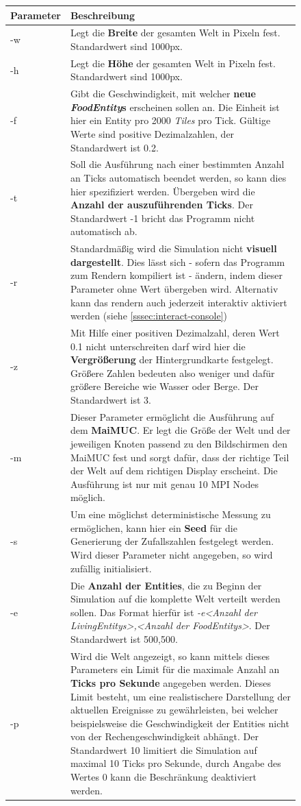 \documentclass[course=erap]{aspdoc}
\begin{document}
\newpage
\begin{figure}
\centering
\begin{longtable}{| p{2cm} | p{12cm} |}
\hline
Parameter & Beschreibung \\
\hline
\hline
-w & Legt die \textbf{Breite} der gesamten Welt in Pixeln fest. Standardwert sind 1000px.\\
\hline
-h & Legt die \textbf{Höhe} der gesamten Welt in Pixeln fest. Standardwert sind 1000px.\\
\hline
-f & Gibt die Geschwindigkeit, mit welcher \textbf{neue \emph{FoodEntity}s} erscheinen sollen an. Die Einheit ist hier ein Entity pro 2000 \emph{Tiles} pro Tick. Gültige Werte sind positive Dezimalzahlen, der Standardwert ist 0.2.\\
\hline
-t & Soll die Ausführung nach einer bestimmten Anzahl an Ticks automatisch beendet werden, so kann dies hier spezifiziert werden. Übergeben wird die \textbf{Anzahl der auszuführenden Ticks}. Der Standardwert -1 bricht das Programm nicht automatisch ab.\\
\hline
-r & Standardmäßig wird die Simulation nicht \textbf{visuell dargestellt}. Dies lässt sich - sofern das Programm zum Rendern kompiliert ist - ändern, indem dieser Parameter ohne Wert übergeben wird. Alternativ kann das rendern auch jederzeit interaktiv aktiviert werden (siehe \ref{sssec:interact-console})\\
\hline
-z & Mit Hilfe einer positiven Dezimalzahl, deren Wert 0.1 nicht unterschreiten darf wird hier die \textbf{Vergrößerung} der Hintergrundkarte festgelegt. Größere Zahlen bedeuten also weniger und dafür größere Bereiche wie Wasser oder Berge. Der Standardwert ist 3.\\
\hline
-m & Dieser Parameter ermöglicht die Ausführung auf dem \textbf{MaiMUC}. Er legt die Größe der Welt und der jeweiligen Knoten passend zu den Bildschirmen den MaiMUC fest und sorgt dafür, dass der richtige Teil der Welt auf dem richtigen Display erscheint. Die Ausführung ist nur mit genau 10 MPI Nodes möglich.\\
\hline
-s & Um eine möglichst deterministische Messung zu ermöglichen, kann hier ein \textbf{Seed} für die Generierung der Zufallszahlen festgelegt werden. Wird dieser Parameter nicht angegeben, so wird zufällig initialisiert.\\
\hline
-e & Die \textbf{Anzahl der Entities}, die zu Beginn der Simulation auf die komplette Welt verteilt werden sollen. Das Format hierfür ist \emph{-e<Anzahl der LivingEntitys>,<Anzahl der FoodEntitys>}. Der Standardwert ist 500,500.\\
\hline
-p & Wird die Welt angezeigt, so kann mittels dieses Parameters ein Limit für die maximale Anzahl an \textbf{Ticks pro Sekunde} angegeben werden. Dieses Limit besteht, um eine realistischere Darstellung der aktuellen Ereignisse zu gewährleisten, bei welcher beispielsweise die Geschwindigkeit der Entities nicht von der Rechengeschwindigkeit abhängt. Der Standardwert 10 limitiert die Simulation auf maximal 10 Ticks pro Sekunde, durch Angabe des Wertes 0 kann die Beschränkung deaktiviert werden.\\
\end{longtable}
\end{figure}
\end{document}
